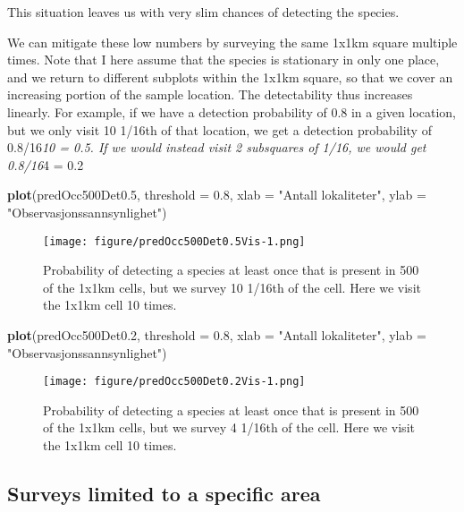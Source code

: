 \documentclass[]{article}
\newenvironment{Shaded}{\begin{snugshade}}{\end{snugshade}}
\newcommand{\KeywordTok}[1]{\textcolor[rgb]{0.13,0.29,0.53}{\textbf{#1}}}
\newcommand{\DataTypeTok}[1]{\textcolor[rgb]{0.13,0.29,0.53}{#1}}
\newcommand{\DecValTok}[1]{\textcolor[rgb]{0.00,0.00,0.81}{#1}}
\newcommand{\FloatTok}[1]{\textcolor[rgb]{0.00,0.00,0.81}{#1}}
\newcommand{\StringTok}[1]{\textcolor[rgb]{0.31,0.60,0.02}{#1}}
\newcommand{\NormalTok}[1]{#1}
\begin{document}
This situation leaves us with very slim chances of detecting the
species.

We can mitigate these low numbers by surveying the same 1x1km square
multiple times. Note that I here assume that the species is stationary
in only one place, and we return to different subplots within the 1x1km
square, so that we cover an increasing portion of the sample location.
The detectability thus increases linearly. For example, if we have a
detection probability of 0.8 in a given location, but we only visit 10
1/16th of that location, we get a detection probability of
0.8/16\emph{10 = 0.5. If we would instead visit 2 subsquares of 1/16, we
would get 0.8/16}4 = 0.2

\begin{Shaded}
\begin{Highlighting}[]
\KeywordTok{plot}\NormalTok{(predOcc500Det0.}\DecValTok{5}\NormalTok{, }\DataTypeTok{threshold =} \FloatTok{0.8}\NormalTok{, }\DataTypeTok{xlab =} \StringTok{"Antall lokaliteter"}\NormalTok{, }\DataTypeTok{ylab =} \StringTok{"Observasjonssannsynlighet"}\NormalTok{)}
\end{Highlighting}
\end{Shaded}

\begin{figure}
\centering
\texttt{[image: figure/predOcc500Det0.5Vis-1.png]}
\caption{Probability of detecting a species at least once that is
present in 500 of the 1x1km cells, but we survey 10 1/16th of the cell.
Here we visit the 1x1km cell 10 times.}
\end{figure}

\begin{Shaded}
\begin{Highlighting}[]
\KeywordTok{plot}\NormalTok{(predOcc500Det0.}\DecValTok{2}\NormalTok{, }\DataTypeTok{threshold =} \FloatTok{0.8}\NormalTok{, }\DataTypeTok{xlab =} \StringTok{"Antall lokaliteter"}\NormalTok{, }\DataTypeTok{ylab =} \StringTok{"Observasjonssannsynlighet"}\NormalTok{)}
\end{Highlighting}
\end{Shaded}

\begin{figure}
\centering
\texttt{[image: figure/predOcc500Det0.2Vis-1.png]}
\caption{Probability of detecting a species at least once that is
present in 500 of the 1x1km cells, but we survey 4 1/16th of the cell.
Here we visit the 1x1km cell 10 times.}
\end{figure}

\subsection{Surveys limited to a specific
area}\label{surveys-limited-to-a-specific-area}
\end{document}
